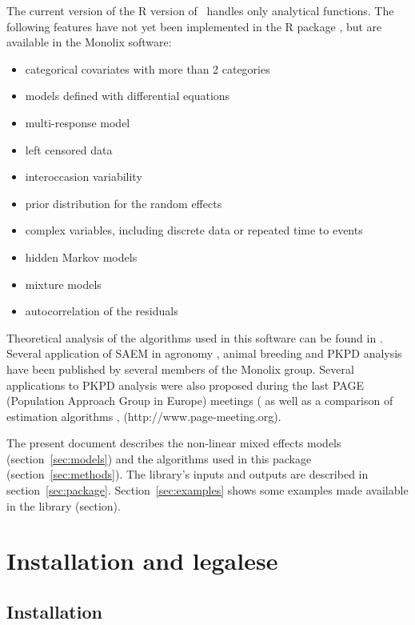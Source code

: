The current version of the R version of \saemix~handles only analytical functions. The following features have not yet been implemented in the R package \saemix, but are available in the {\sc Monolix} software:
\begin{itemize}
\item categorical covariates with more than 2 categories
\item models defined with differential equations
\item multi-response model
\item left censored data
\item interoccasion variability
\item prior distribution for the random effects
\item complex variables, including discrete data or repeated time to events
\item hidden Markov models
\item mixture models
\item autocorrelation of the residuals
\end{itemize}

Theoretical analysis of the algorithms used in this software can be found in \cite{Delyon, samson_jspi06, Kuhn01, Kuhn05}. Several application of SAEM in agronomy \cite{Makowski06}, animal breeding \cite{Jaffrezic06} and PKPD analysis \cite{Comets07, Lavielle07, samson_csda06, samson_sim06a, Bertrand09} have been published by several members of the {\sf Monolix} group. Several applications to PKPD analysis were also proposed during the last PAGE (Population Approach Group in Europe) meetings (\cite{page06b, page05a, page03, page04a, page06c, page05b} as well as a comparison of estimation algorithms \cite{page05c}, ({http://www.page-meeting.org}).

The present document describes the non-linear mixed effects models (section~\ref{sec:models}) and the algorithms used in this package (section~\ref{sec:methods}). The library's inputs and outputs are described in section~\ref{sec:package}. Section~\ref{sec:examples} shows some examples made available in the library (section).

\section{Installation and legalese} \label{sec:installation}

\subsection{Installation}

